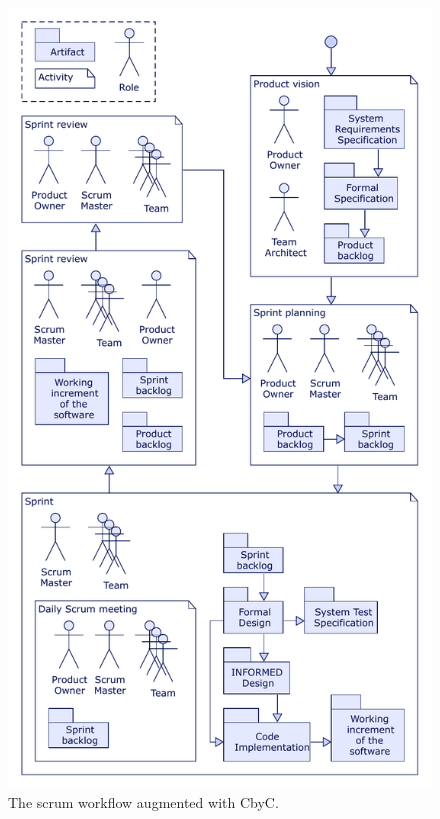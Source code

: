 \begin{figure}[H]
	\centering
	\includegraphics[scale=0.75]{Figures/Scrum_CbyC_workflow.pdf}
	\decoRule
	\caption{The scrum workflow augmented with CbyC.}
	\label{fig:ScrumCbyCWorkflow}
\end{figure}






